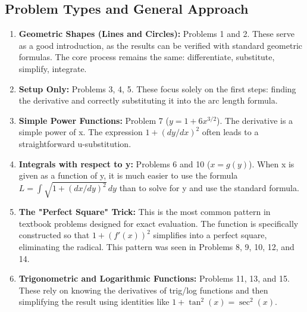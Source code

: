 \documentclass{article}
\begin{document}
\subsection{Problem Types and General Approach}
\begin{enumerate}
    \item \textbf{Geometric Shapes (Lines and Circles):} Problems 1 and 2. These serve as a good introduction, as the results can be verified with standard geometric formulas. The core process remains the same: differentiate, substitute, simplify, integrate.
    \item \textbf{Setup Only:} Problems 3, 4, 5. These focus solely on the first steps: finding the derivative and correctly substituting it into the arc length formula.
    \item \textbf{Simple Power Functions:} Problem 7 ($y = 1+6x^{3/2}$). The derivative is a simple power of x. The expression $1+(dy/dx)^2$ often leads to a straightforward u-substitution.
    \item \textbf{Integrals with respect to y:} Problems 6 and 10 ($x=g(y)$). When x is given as a function of y, it is much easier to use the formula $ L = \int \sqrt{1+(dx/dy)^2} \,dy $ than to solve for y and use the standard formula.
    \item \textbf{The "Perfect Square" Trick:} This is the most common pattern in textbook problems designed for exact evaluation. The function is specifically constructed so that $1+(f'(x))^2$ simplifies into a perfect square, eliminating the radical. This pattern was seen in Problems 8, 9, 10, 12, and 14.
    \item \textbf{Trigonometric and Logarithmic Functions:} Problems 11, 13, and 15. These rely on knowing the derivatives of trig/log functions and then simplifying the result using identities like $1+\tan^2(x) = \sec^2(x)$.
\end{enumerate}
\end{document}
